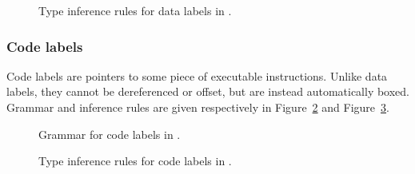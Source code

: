 \begin{figure}[H]
	\centering


	\caption{Type inference rules for data labels in \nstar.}
	\label{fig:nstar-common-expressions-labels-data-typerules}
\end{figure}

\subsubsection{Code labels}\label{subsubsec:nstar-common-expressions-labels-code}

Code labels are pointers to some piece of executable instructions.
Unlike data labels, they cannot be dereferenced or offset, but are instead automatically boxed.
Grammar and inference rules are given respectively in Figure~\ref{fig:nstar-common-expressions-labels-code-grammar} and Figure~\ref{fig:nstar-common-expressions-labels-code-typerules}.

\begin{figure}[H]
	\centering


	\caption{Grammar for code labels in \nstar.}
	\label{fig:nstar-common-expressions-labels-code-grammar}
\end{figure}

\begin{figure}[H]
	\centering


	\caption{Type inference rules for code labels in \nstar.}
	\label{fig:nstar-common-expressions-labels-code-typerules}
\end{figure}

